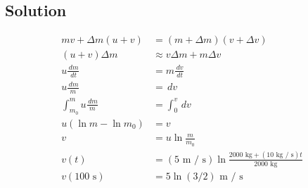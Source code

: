 \documentclass[solutions]{esg8012pset}
\renewcommand{\d}{\,d}
\begin{document}
\subsection{Solution}
  \begin{align*}
   m v + \Delta m (u + v) & = (m + \Delta m) (v + \Delta v) \\
   (u + v)\Delta m & \approx v\Delta m + m\Delta v \\
   u\frac{\d m}{\d t} & = m\frac{\d v}{\d t} \\
   u\frac{\d m}{m} & = \d v \\
   \int_{m_0}^{m} u\frac{\d m}{m} & = \int_{0}^{v} \d v \\
   u(\ln m - \ln m_0) & = v \\
   v & = u\ln\frac{m}{m_0} \\
   v(t) & = (5\text{ m / s})\ln\frac{2000\text{ kg} + (10\text{ kg / s})t}{2000\text{ kg}} \\
   v(100\text{ s}) %
    & = 5\ln(3 / 2)\text{ m / s}
  \end{align*}
\end{document}
